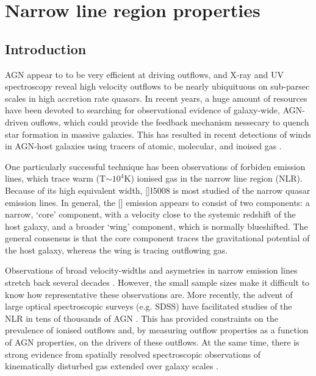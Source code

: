 
\chapter{Narrow line region properties}
\label{ch:nlr} 

\section{Introduction}

AGN appear to to be very efficient at driving outflows, and X-ray and UV spectroscopy reveal high velocity outflows to be nearly ubiquituous on sub-parsec scales in high accretion rate quasars.
In recent years, a huge amount of resources have been devoted to searching for observational evidence of galaxy-wide, AGN-driven ouflows, which could provide the feedback mechanism nessecary to quench star formation in massive galaxies. 
This has resulted in recent detections of winds in AGN-host galaxies using tracers of atomic, molecular, and inoised gas \citep[e.g.][]{nesvadba06,arav08,nesvadba08,moe09,dunn10,alexander10,harrison12,harrison14,nesvadba10,rupke13,veilleux13,nardini15,feruglio10,alatalo11,cimatti13,cicone14}.  

One particularly successful technique has been observations of forbiden emission lines, which trace warm (T$\sim10^4$K) ionised gas in the narrow line region (NLR). 
Because of its high equivalent width, []\l5008 is most studied of the narrow quasar emission lines. 
In general, the [] emission appears to consist of two components: a narrow, `core' component, with a velocity close to the systemic redshift of the host galaxy, and a broader `wing' component, which is normally blueshifted. 
The general consensus is that the core component traces the gravitational potential of the host galaxy, whereas the wing is tracing outflowing gas. 

Observations of broad velocity-widths and asymetries in narrow emission lines stretch back several decades \citep[e.g.][]{weedman70,stockton76,heckman81,veron81,feldman82,heckman84,vrtilek85,whittle85,boroson92}. 
However, the small sample sizes make it difficult to know how representative these observations are. 
More recently, the advent of large optical spectroscopic surveys (e.g. SDSS) have facilitated studies of the NLR in tens of thousands of AGN \citep[e.g.][]{boroson05,greene05a,zhang11,mullaney13,zakamska14,shen14}. 
This has provided constraints on the prevalence of ionised outflows and, by measuring outflow properties as a function of AGN properties, on the drivers of these outflows.  
At the same time, there is strong evidence from spatially resolved spectroscopic observations of kinematically disturbed gas extended over galaxy scales \citep[e.g.][]{greene09,greene11,hainline13,harrison12,harrison14}. 

